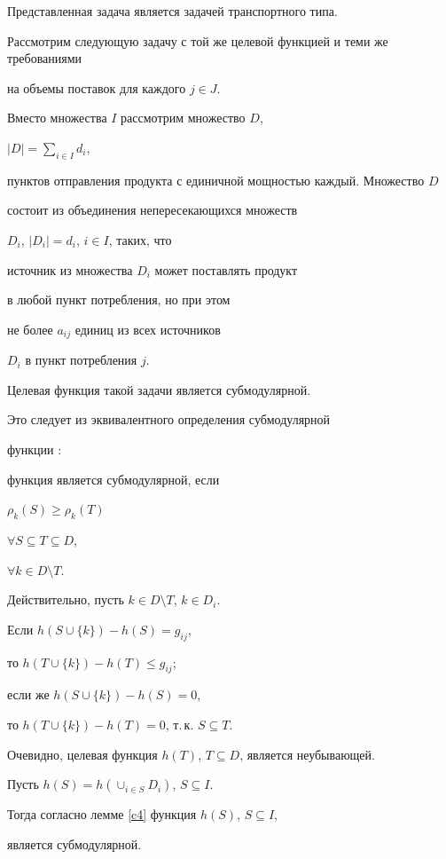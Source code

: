 \begin{pf}


Представленная задача является задачей транспортного типа.


Рассмотрим следующую задачу с той же целевой функцией и теми же требованиями


на объемы поставок для каждого $j \in J$. 


Вместо множества $I$ рассмотрим множество $D$,


$|D|= \sum\limits_{i \in I} d_{i}$, 


пунктов отправления продукта с единичной мощностью каждый. Множество $D$ 


состоит из объединения непересекающихся множеств


$D_{i}$, $|D_{i}|= d_{i}$, $i \in I$, таких, что


источник из множества $D_{i}$ может поставлять продукт 


в любой пункт потребления, но при этом


не более $a_{ij}$ единиц из всех источников


$D_i$ в пункт потребления $j$. 





Целевая функция такой задачи является субмодулярной. 


Это следует из  эквивалентного определения субмодулярной 


функции \cite{NWF78}:


функция является субмодулярной, если 


$\rho_k(S) \ge \rho_k(T)$ 


$\forall S \subseteq T \subseteq D$, 


$\forall k \in D \setminus T$. 


Действительно, пусть $k \in D \setminus T$, $k \in D_{i}$. 


Если $h(S \cup \{k \}) - h(S) = g_{ij}$,


то $h(T \cup \{k \}) - h(T) \le g_{ij}$;


если же $h(S \cup \{k \}) - h(S) = 0$,


то $h(T \cup \{k \}) - h(T) = 0$, т.\,к. $S \subseteq T$.


Очевидно, целевая функция $h(T)$, $T \subseteq D$, является неубывающей. 





Пусть $h(S) = h( \cup_{i \in S}D_{i})$, $S \subseteq I$.


Тогда согласно лемме \ref{c4} функция $h(S)$, $S \subseteq I$,


является субмодулярной.


\end{pf}





